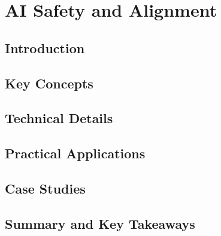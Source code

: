 ﻿%

\chapter{AI Safety and Alignment}
\label{ch:chapter-13}

\section{Introduction}


\section{Key Concepts}


\section{Technical Details}


\section{Practical Applications}


\section{Case Studies}


\section{Summary and Key Takeaways}


